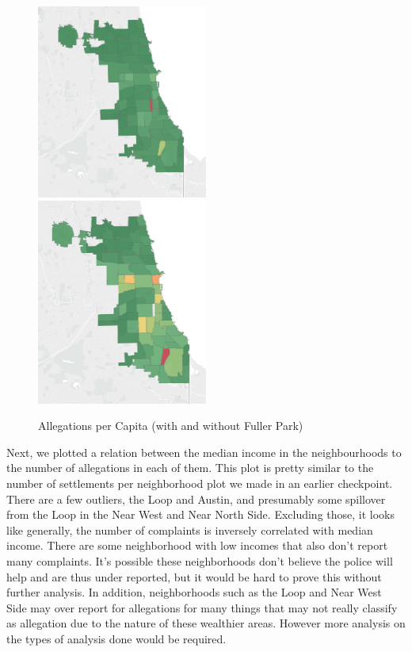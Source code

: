 \documentclass[11pt]{article}
\begin{document}
\begin{figure}[h]
\caption{Allegations per Capita (with and without Fuller Park)}
\includegraphics[width=0.5\textwidth]{plot1.png}
\includegraphics[width=0.5\textwidth]{plot2.png}
\end{figure}

Next, we plotted a relation between the median income in the neighbourhoods to the number of allegations in each of them. This plot is pretty similar to the number of settlements per neighborhood plot we made in an earlier checkpoint. There are a few outliers, the Loop and Austin, and presumably some spillover from the Loop in the Near West and Near North Side. Excluding those, it looks like generally, the number of complaints is inversely correlated with median income. There are some neighborhood with low incomes that also don’t report many complaints. It’s possible these neighborhoods don’t believe the police will help and are thus under reported, but it would be hard to prove this without further analysis. In addition, neighborhoods such as the Loop and Near West Side may over report for allegations for many things that may not really classify as allegation due to the nature of these wealthier areas. However more analysis on the types of analysis done would be required.
\end{document}
